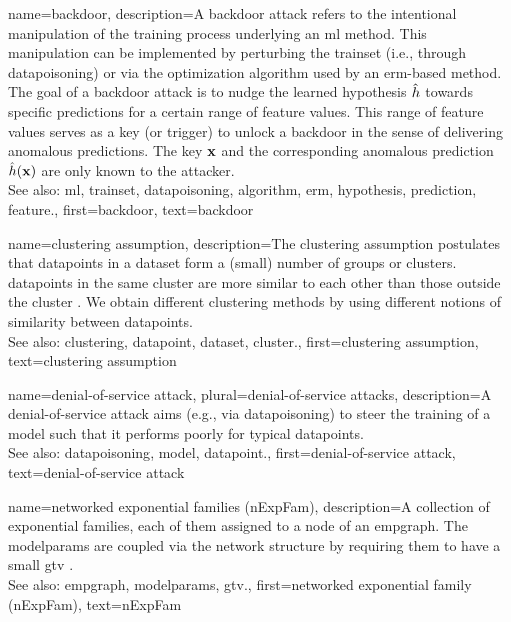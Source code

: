 	
{name={backdoor}, 
	description={A backdoor attack refers 
		to the intentional manipulation of the training process underlying an \gls{ml} method. This manipulation 
		can be implemented by perturbing the \gls{trainset} (i.e., through \gls{datapoisoning}) or via the 
		optimization \gls{algorithm} used by an \gls{erm}-based method. The goal of a 
		backdoor attack is to nudge the learned \gls{hypothesis} $\hat{h}$ 
		towards specific \glspl{prediction} for a certain range of \gls{feature} values. This range of \gls{feature} 
		values serves as a key (or trigger) to unlock a backdoor in the sense of 
		delivering anomalous \glspl{prediction}. The key ${\bf x}$ and the corresponding 
		anomalous \gls{prediction} $\hat{h}({\bf x})$ are only known to the attacker.
				\\
		See also: \gls{ml}, \gls{trainset}, \gls{datapoisoning}, \gls{algorithm}, \gls{erm}, \gls{hypothesis}, \gls{prediction}, \gls{feature}.},
	first={backdoor},
	text={backdoor} 
}


{name={clustering assumption}, 
	description={The 
		\gls{clustering} assumption postulates that \glspl{datapoint} in a \gls{dataset} form a (small) number of 
		groups or \glspl{cluster}. \Glspl{datapoint} in the same \gls{cluster} are more similar to each 
		other than those outside the \gls{cluster} \cite{SemiSupervisedBook}. We obtain different 
		\gls{clustering} methods by using different notions of similarity between \glspl{datapoint}.
				\\
		See also: \gls{clustering}, \gls{datapoint}, \gls{dataset}, \gls{cluster}.},
	first={clustering assumption},
	text={clustering assumption} 
}
	
{name={denial-of-service attack}, plural={denial-of-service attacks},
	description={A 
		denial-of-service attack aims (e.g., via \gls{datapoisoning}) to steer the training of a \gls{model} 
		such that it performs poorly for typical \glspl{datapoint}.
				\\
		See also: \gls{datapoisoning}, \gls{model}, \gls{datapoint}.},
	first={denial-of-service attack},
	text={denial-of-service attack} 
}

{name={networked exponential families (nExpFam)}, 
	description={A collection of exponential 
		families, each of them assigned to a node of an \gls{empgraph}. The \gls{modelparams} are coupled 
	   	via the network structure by requiring them to have a small \gls{gtv} \cite{JungNetExp2020}.
	   		\\
		See also: \gls{empgraph}, \gls{modelparams}, \gls{gtv}.},
	first={networked exponential family (nExpFam)},
	text={nExpFam} 
}
	 

